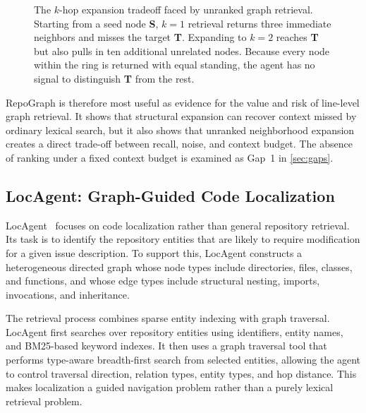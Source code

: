 \begin{figure}[H]
    \caption{The $k$-hop expansion tradeoff faced by unranked graph retrieval. Starting from a seed node \textbf{S}, $k{=}1$ retrieval returns three immediate neighbors and misses the target \textbf{T}. Expanding to $k{=}2$ reaches \textbf{T} but also pulls in ten additional unrelated nodes. Because every node within the ring is returned with equal standing, the agent has no signal to distinguish \textbf{T} from the rest.}
    \label{fig:khop-explosion}
\end{figure}

RepoGraph is therefore most useful as evidence for the value and risk of line-level graph retrieval. It shows that structural expansion can recover context missed by ordinary lexical search, but it also shows that unranked neighborhood expansion creates a direct trade-off between recall, noise, and context budget. The absence of ranking under a fixed context budget is examined as Gap~1 in \cref{sec:gaps}.

\subsection{LocAgent: Graph-Guided Code Localization}
\label{sec:locagent}

LocAgent~\cite{chen2025locagent} focuses on code localization rather than general repository retrieval. Its task is to identify the repository entities that are likely to require modification for a given issue description. To support this, LocAgent constructs a heterogeneous directed graph whose node types include directories, files, classes, and functions, and whose edge types include structural nesting, imports, invocations, and inheritance.

The retrieval process combines sparse entity indexing with graph traversal. LocAgent first searches over repository entities using identifiers, entity names, and BM25-based keyword indexes. It then uses a graph traversal tool that performs type-aware breadth-first search from selected entities, allowing the agent to control traversal direction, relation types, entity types, and hop distance. This makes localization a guided navigation problem rather than a purely lexical retrieval problem.

